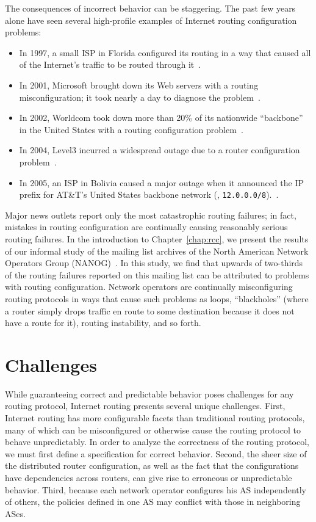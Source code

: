 The consequences of incorrect behavior can be staggering.  The past few
years alone have seen several high-profile examples of Internet routing
configuration problems:

\begin{itemize}
\item In
1997, a small ISP in Florida configured its routing in a way that caused
all of the Internet's traffic to be routed through it~\cite{www-as7007}.
\item In 2001, Microsoft brought down its Web servers with a routing
misconfiguration; it took nearly a day to diagnose the
problem~\cite{www-microsoft-outage}.  
\item In 2002, Worldcom took down more
than 20\% of its nationwide ``backbone'' in the United States with a
routing configuration problem~\cite{www-worldcom-outage}.  
\item In 2004, Level3 incurred a widespread outage due to a router
configuration problem~\cite{www-l3-outage}.
\item In 2005, an ISP in Bolivia caused a major outage when it announced
the IP prefix for AT\&T's United States backbone
network (\ie, {\tt 12.0.0.0/8}).~\cite{nanog-att}. 
\end{itemize}
Major news outlets report only the most catastrophic routing failures;
in fact, mistakes in routing configuration are continually causing
reasonably serious routing failures.  In the introduction to
Chapter~\ref{chap:rcc}, we 
present the results of our informal study of the mailing list archives
of the North American Network Operators Group (NANOG)~\cite{nanog-list}.
In this study, we 
find that upwards of two-thirds of the routing failures reported on this
mailing list can be attributed to problems with routing configuration.
Network operators are continually misconfiguring routing protocols in
ways that cause such problems as loops, ``blackholes'' (where a router
simply drops traffic en route to some destination because it does not
have a route for it), routing instability, and so forth.  


\section{Challenges}\label{sec:challenges}

While guaranteeing correct and predictable behavior poses challenges for
any routing protocol, Internet routing presents several unique
challenges.  First, Internet routing has more configurable facets
than traditional routing protocols, many
of which can be misconfigured or otherwise cause the routing protocol to
behave unpredictably.  In order to analyze the correctness of the
routing protocol, we must first define a specification for correct
behavior.  Second, the sheer size of the distributed
router configuration, as well as the fact that the configurations have
dependencies across routers, can give rise to erroneous or unpredictable
behavior.  Third, because each network operator configures his AS
independently of others, the policies defined in one AS may conflict
with those in neighboring ASes.

